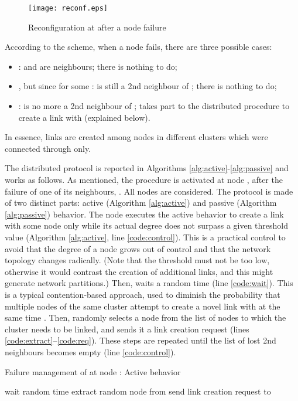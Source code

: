 \documentclass{www13-companion-accepted}
\begin{document}
\begin{figure}[thbp]
   \centering
   \texttt{[image: reconf.eps]}
\caption{Reconfiguration at  after a node failure}
   \label{fig:schema}
\end{figure}

According to the scheme, when a node  fails,  there are three possible cases:\\
\begin{itemize}
 \item  :  and  are neighbours; there is nothing to do;
 \item , but  since  for some :  is still a 2nd neighbour of ; there is nothing to do;
 \item  :  is no more a 2nd neighbour of ;  takes part to the distributed procedure to create a link with  (explained below).
\end{itemize}
In essence, links are created among nodes in different clusters which were connected through  only.




The distributed protocol is reported in Algorithms \ref{alg:active}-\ref{alg:passive} and works as follows. As mentioned, the procedure is activated at node , after the failure of one of its neighbours, . All nodes  are considered. 
The protocol is made of two distinct parts: active (Algorithm \ref{alg:active}) and passive (Algorithm \ref{alg:passive}) behavior.
The node  executes the active behavior to create a link with some node only while its actual degree does not surpass a given threshold value (Algorithm \ref{alg:active}, line \ref{code:control}). This is a practical control to avoid that the degree of a node grows out of control and that the network topology changes radically. (Note that the threshold must not be too low, otherwise it would contrast the creation of additional links, and this might generate network partitions.)
Then,  waits a random time (line \ref{code:wait}). This is a typical contention-based approach, used to diminish the probability that multiple nodes of the same cluster attempt to create a novel link with  at the same time \cite{PalazziFR09}. Then,  randomly selects a node  from the list of nodes to which the cluster needs to be linked, and sends it a link creation request (lines \ref{code:extract}--\ref{code:req}). These steps are repeated until the list of lost 2nd neighbours becomes empty (line \ref{code:control}).

\begin{algorithm}[htbp]
\caption{Failure management of  at node : Active behavior}
\label{alg:active}
\begin{algorithmic}[1]
\State 
\Statex
\While {(}\label{code:control}
  \State wait random time \label{code:wait}\State  extract random node from  \label{code:extract}
\State send link creation request to \label{code:req}
\EndWhile
\end{algorithmic}
\end{algorithm}
\end{document}
